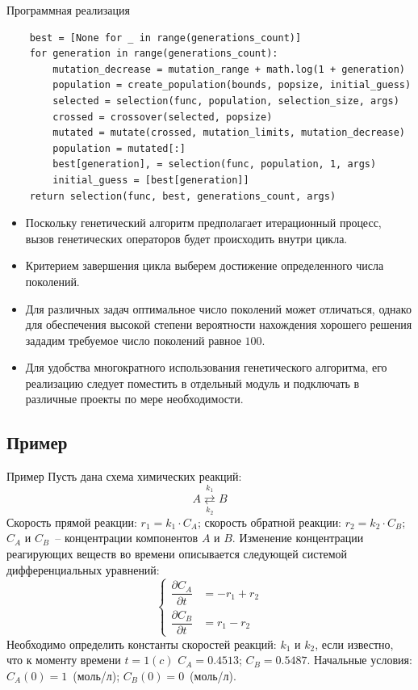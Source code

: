 \documentclass[aspectratio=169, mathserif]{beamer}	%
\begin{document}
\begin{frame}[fragile]{Программная реализация}
\scriptsize
\begin{verbatim}
    best = [None for _ in range(generations_count)]
    for generation in range(generations_count):
        mutation_decrease = mutation_range + math.log(1 + generation)
        population = create_population(bounds, popsize, initial_guess)
        selected = selection(func, population, selection_size, args)
        crossed = crossover(selected, popsize)
        mutated = mutate(crossed, mutation_limits, mutation_decrease)
        population = mutated[:]
        best[generation], = selection(func, population, 1, args)
        initial_guess = [best[generation]]
    return selection(func, best, generations_count, args)
\end{verbatim}
\vfill
\begin{itemize}
	\item Поскольку генетический алгоритм предполагает итерационный процесс, вызов генетических операторов будет происходить внутри цикла.
	\item Критерием завершения цикла выберем достижение определенного числа поколений.
	\item Для различных задач оптимальное число поколений может отличаться, однако для обеспечения высокой степени вероятности нахождения хорошего решения зададим требуемое число поколений равное $100$.
	\item Для удобства многократного использования генетического алгоритма, его реализацию следует поместить в отдельный модуль и подключать в различные проекты по мере необходимости.
\end{itemize}
\vfill
\end{frame}

\subsection{Пример}
\begin{frame}[fragile]{Пример}
\scriptsize
Пусть дана схема химических реакций:
\vfill
$$
A \overset{k_1}{\underset{k_2}{\rightleftarrows}} B
$$
\vfill
Скорость прямой реакции: $r_1 = k_1 \cdot C_A$; скорость обратной реакции:
$r_2 = k_2 \cdot C_B$; $C_A$ и $C_B$~-- концентрации компонентов $A$ и $B$.
Изменение концентрации реагирующих веществ во времени описывается следующей системой дифференциальных уравнений:
\vfill
\begin{equation*}
	\left\{
	\begin{aligned}
		\dfrac{\partial C_A}{\partial t} &= -r_1 + r_2 \\
		\dfrac{\partial C_B}{\partial t} &= r_1 - r_2
	\end{aligned}
	\right.
\end{equation*}
\vfill
Необходимо определить константы скоростей реакций: $k_1$ и $k_2$, если известно, что к моменту времени $t=1 (c)$   $C_A = 0.4513$; $C_B = 0.5487$. Начальные условия: $C_A(0) = 1$~(моль/л); $C_B(0) = 0$~(моль/л).
\vfill
\end{frame}
\end{document}

